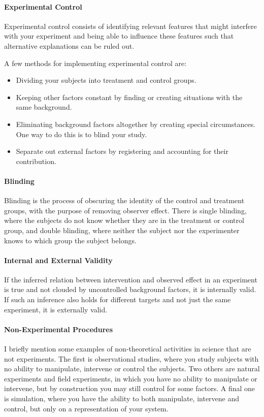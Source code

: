 \paragraph{Experimental Control}
Experimental control consists of identifying relevant features that might interfere with your experiment and being able to influence these features such that alternative explanations can be ruled out.

A few methods for implementing experimental control are:
\begin{itemize}
	\item Dividing your subjects into treatment and control groups.
	\item Keeping other factors constant by finding or creating situations with the same background.
	\item Eliminating background factors altogether by creating special circumstances. One way to do this is to blind your study.
	\item Separate out external factors by registering and accounting for their contribution.
\end{itemize}

\paragraph{Blinding}
Blinding is the process of obscuring the identity of the control and treatment groups, with the purpose of removing observer effect. There is single blinding, where the subjects do not know whether they are in the treatment or control group, and double blinding, where neither the subject nor the experimenter knows to which group the subject belongs.

\paragraph{Internal and External Validity}
If the inferred relation between intervention and observed effect in an experiment is true and not clouded by uncontrolled background factors, it is internally valid. If such an inference also holds for different targets and not just the same experiment, it is externally valid.

\paragraph{Non-Experimental Procedures}
I briefly mention some examples of non-theoretical activities in science that are not experiments. The first is observational studies, where you study subjects with no ability to manipulate, intervene or control the subjects. Two others are natural experiments and field experiments, in which you have no ability to manipulate or intervene, but by construction you may still control for some factors. A final one is simulation, where you have the ability to both manipulate, intervene and control, but only on a representation of your system.

